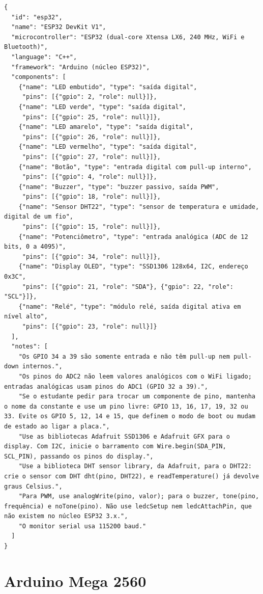 \begin{apendicesenv}
\begin{lstlisting}
{
  "id": "esp32",
  "name": "ESP32 DevKit V1",
  "microcontroller": "ESP32 (dual-core Xtensa LX6, 240 MHz, WiFi e Bluetooth)",
  "language": "C++",
  "framework": "Arduino (núcleo ESP32)",
  "components": [
    {"name": "LED embutido", "type": "saída digital",
     "pins": [{"gpio": 2, "role": null}]},
    {"name": "LED verde", "type": "saída digital",
     "pins": [{"gpio": 25, "role": null}]},
    {"name": "LED amarelo", "type": "saída digital",
     "pins": [{"gpio": 26, "role": null}]},
    {"name": "LED vermelho", "type": "saída digital",
     "pins": [{"gpio": 27, "role": null}]},
    {"name": "Botão", "type": "entrada digital com pull-up interno",
     "pins": [{"gpio": 4, "role": null}]},
    {"name": "Buzzer", "type": "buzzer passivo, saída PWM",
     "pins": [{"gpio": 18, "role": null}]},
    {"name": "Sensor DHT22", "type": "sensor de temperatura e umidade, digital de um fio",
     "pins": [{"gpio": 15, "role": null}]},
    {"name": "Potenciômetro", "type": "entrada analógica (ADC de 12 bits, 0 a 4095)",
     "pins": [{"gpio": 34, "role": null}]},
    {"name": "Display OLED", "type": "SSD1306 128x64, I2C, endereço 0x3C",
     "pins": [{"gpio": 21, "role": "SDA"}, {"gpio": 22, "role": "SCL"}]},
    {"name": "Relé", "type": "módulo relé, saída digital ativa em nível alto",
     "pins": [{"gpio": 23, "role": null}]}
  ],
  "notes": [
    "Os GPIO 34 a 39 são somente entrada e não têm pull-up nem pull-down internos.",
    "Os pinos do ADC2 não leem valores analógicos com o WiFi ligado; entradas analógicas usam pinos do ADC1 (GPIO 32 a 39).",
    "Se o estudante pedir para trocar um componente de pino, mantenha o nome da constante e use um pino livre: GPIO 13, 16, 17, 19, 32 ou 33. Evite os GPIO 5, 12, 14 e 15, que definem o modo de boot ou mudam de estado ao ligar a placa.",
    "Use as bibliotecas Adafruit SSD1306 e Adafruit GFX para o display. Com I2C, inicie o barramento com Wire.begin(SDA_PIN, SCL_PIN), passando os pinos do display.",
    "Use a biblioteca DHT sensor library, da Adafruit, para o DHT22: crie o sensor com DHT dht(pino, DHT22), e readTemperature() já devolve graus Celsius.",
    "Para PWM, use analogWrite(pino, valor); para o buzzer, tone(pino, frequência) e noTone(pino). Não use ledcSetup nem ledcAttachPin, que não existem no núcleo ESP32 3.x.",
    "O monitor serial usa 115200 baud."
  ]
}
\end{lstlisting}

\section{Arduino Mega 2560}


\end{apendicesenv}
